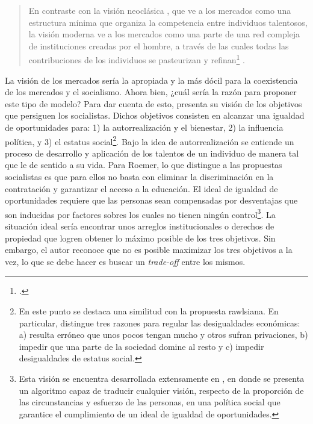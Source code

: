 \vspace{3mm}
\begin{quote}
En contraste con la visión neoclásica , que ve a los mercados como una estructura mínima que organiza la competencia entre individuos talentosos, la visión  moderna ve a los mercados como una parte de una red compleja de instituciones creadas por el hombre, a través de las cuales todas las contribuciones de los individuos se pasteurizan y refinan\footnote{ \citep[p. 5-6]{Roemer_1994}.} \citep[p. 5-6]{Roemer_1994}. 
\end{quote}
\vspace{3mm}

La visión  de los mercados sería la apropiada y la más dócil para la coexistencia de los mercados y el socialismo. Ahora bien, ¿cuál sería la razón para proponer este tipo de modelo? Para dar cuenta de esto, \citet{Roemer_1994} presenta su visión de los objetivos que persiguen los socialistas. Dichos objetivos consisten en alcanzar una igualdad de oportunidades para: 1) la autorrealización y el bienestar, 2) la influencia política, y 3) el estatus social\footnote{En este punto se destaca una similitud con la propuesta rawlsiana. En particular, \citet[p. 177-178]{Rawls_2002} distingue tres razones para regular las desigualdades económicas: a) resulta erróneo que unos pocos tengan mucho y otros sufran privaciones, b) impedir que una parte de la sociedad domine al resto y c) impedir desigualdades de estatus social.}. Bajo la idea de autorrealización se entiende un proceso de desarrollo y aplicación de los talentos de un individuo de manera tal que le de sentido a su vida. Para Roemer, lo que distingue a las propuestas socialistas es que para ellos no basta con eliminar la discriminación en la contratación y garantizar el acceso a la educación. El ideal de igualdad de oportunidades requiere que las personas sean compensadas por desventajas que son inducidas por factores sobres los cuales no tienen ningún control\footnote{Esta visión se encuentra desarrollada extensamente en \citet{Roemer_1998}, en donde se presenta un algoritmo capaz de traducir cualquier visión, respecto de la proporción de las circunstancias y esfuerzo de las personas, en una política social que garantice el cumplimiento de un ideal de igualdad de oportunidades.}. La situación ideal sería encontrar unos arreglos institucionales o derechos de propiedad que logren obtener lo máximo posible de los tres objetivos. Sin embargo, el autor reconoce que no es posible maximizar los tres objetivos a la vez, lo que se debe hacer es buscar un \textit{trade-off} entre los mismos. 

